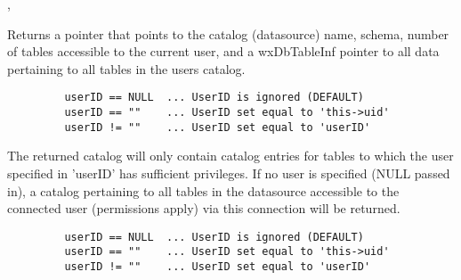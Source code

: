 
, 


\label{wxdbgetcatalog}


Returns a  pointer that points to the catalog 
(datasource) name, schema, number of tables accessible to the current user, 
and a wxDbTableInf pointer to all data pertaining to all tables in the users 
catalog.



\begin{verbatim}
         userID == NULL  ... UserID is ignored (DEFAULT)
         userID == ""    ... UserID set equal to 'this->uid'
         userID != ""    ... UserID set equal to 'userID'
\end{verbatim}


The returned catalog will only contain catalog entries for tables to which the user specified in 'userID' has sufficient privileges.  If no user is specified (NULL passed in), a catalog pertaining to all tables in the datasource accessible to the connected user (permissions apply) via this connection will be returned.

\label{wxdbgetcolumncount}





\begin{verbatim}
         userID == NULL  ... UserID is ignored (DEFAULT)
         userID == ""    ... UserID set equal to 'this->uid'
         userID != ""    ... UserID set equal to 'userID'
\end{verbatim}

